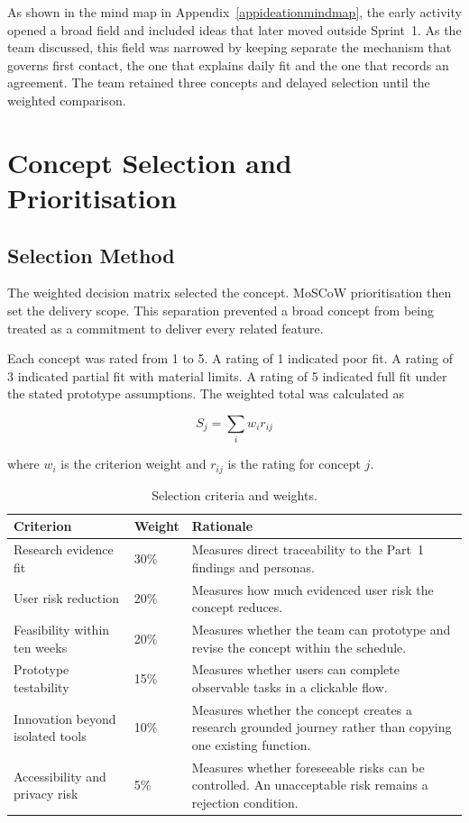 \documentclass[11pt,a4paper]{article}
\begin{document}
As shown in the mind map in Appendix~\ref{appideationmindmap}, the early activity opened a broad field and included ideas that later moved outside Sprint~1. As the team discussed, this field was narrowed by keeping separate the mechanism that governs first contact, the one that explains daily fit and the one that records an agreement. The team retained three concepts and delayed selection until the weighted comparison.

\section{Concept Selection and Prioritisation}
\label{secconceptselection}

\subsection{Selection Method}
\label{subsecselectionmethod}

The weighted decision matrix selected the concept. MoSCoW prioritisation then set the delivery scope. This separation prevented a broad concept from being treated as a commitment to deliver every related feature.

Each concept was rated from 1 to 5. A rating of 1 indicated poor fit. A rating of 3 indicated partial fit with material limits. A rating of 5 indicated full fit under the stated prototype assumptions. The weighted total was calculated as

\[
S_j = \sum_i w_i r_{ij}
\]

where $w_i$ is the criterion weight and $r_{ij}$ is the rating for concept $j$.

\begin{table}[H]
    \centering
    \small
    \caption{Selection criteria and weights.}
    \begin{tabularx}{\textwidth}{@{}L{4.0cm}L{1.3cm}Y@{}}
        \toprule
        Criterion & Weight & Rationale\\
        \midrule
        Research evidence fit & 30\% & Measures direct traceability to the Part~1 findings and personas.\\
        User risk reduction & 20\% & Measures how much evidenced user risk the concept reduces.\\
        Feasibility within ten weeks & 20\% & Measures whether the team can prototype and revise the concept within the schedule.\\
        Prototype testability & 15\% & Measures whether users can complete observable tasks in a clickable flow.\\
        Innovation beyond isolated tools & 10\% & Measures whether the concept creates a research grounded journey rather than copying one existing function.\\
        Accessibility and privacy risk & 5\% & Measures whether foreseeable risks can be controlled. An unacceptable risk remains a rejection condition.\\
        \bottomrule
    \end{tabularx}
    \label{tabcriterionorigin}
\end{table}
\end{document}
